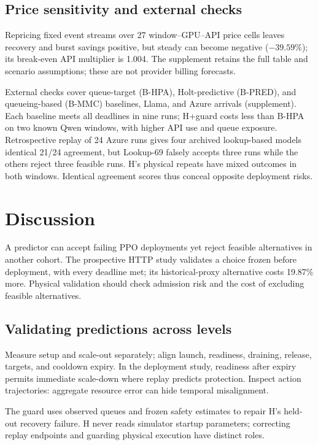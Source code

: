 \subsection{Price sensitivity and external checks}
Repricing fixed event streams over 27 window--GPU--API price cells leaves
recovery and burst savings positive, but steady can become negative
($-39.59\%$); its break-even API multiplier is 1.004. The supplement retains
the full table and scenario assumptions; these are not provider billing forecasts.

External checks cover queue-target (B-HPA), Holt-predictive (B-PRED),
and queueing-based (B-MMC) baselines, Llama, and Azure arrivals
(supplement). Each baseline meets all deadlines in nine runs; H+guard costs less than B-HPA on two
known Qwen windows, with higher API use and queue exposure. Retrospective
replay of 24 Azure runs gives four archived lookup-based models identical 21/24 agreement,
but Lookup-69 falsely accepts three runs while the others reject three feasible runs.
H's physical repeats have mixed outcomes in both windows. Identical
agreement scores thus conceal opposite deployment risks.

\section{Discussion}
A predictor can accept failing PPO deployments yet reject feasible
alternatives in another cohort. The prospective HTTP study validates a
choice frozen before deployment, with every deadline met; its historical-proxy
alternative costs 19.87\% more. Physical validation should check admission
risk and the cost of excluding feasible alternatives.

\subsection{Validating predictions across levels}
Measure setup and scale-out separately; align launch, readiness, draining,
release, targets, and cooldown expiry. In the deployment study, readiness after
expiry permits immediate scale-down where replay predicts protection. Inspect
action trajectories: aggregate resource error can hide temporal misalignment.

The guard uses observed queues and frozen safety estimates to repair H's
held-out recovery failure. H never reads simulator startup parameters;
correcting replay endpoints and guarding physical execution have distinct roles.

